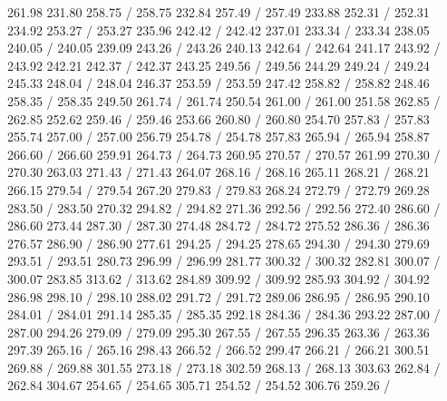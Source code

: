 { 261.98 231.80 258.75 /
 258.75 232.84 257.49 /
 257.49 233.88 252.31 /
 252.31 234.92 253.27 /
 253.27 235.96 242.42 /
 242.42 237.01 233.34 /
 233.34 238.05 240.05 /
 240.05 239.09 243.26 /
 243.26 240.13 242.64 /
 242.64 241.17 243.92 /
 243.92 242.21 242.37 /
 242.37 243.25 249.56 /
 249.56 244.29 249.24 /
 249.24 245.33 248.04 /
 248.04 246.37 253.59 /
 253.59 247.42 258.82 /
 258.82 248.46 258.35 /
 258.35 249.50 261.74 /
 261.74 250.54 261.00 /
 261.00 251.58 262.85 /
 262.85 252.62 259.46 /
 259.46 253.66 260.80 /
 260.80 254.70 257.83 /
 257.83 255.74 257.00 /
 257.00 256.79 254.78 /
 254.78 257.83 265.94 /
 265.94 258.87 266.60 /
 266.60 259.91 264.73 /
 264.73 260.95 270.57 /
 270.57 261.99 270.30 /
 270.30 263.03 271.43 /
 271.43 264.07 268.16 /
 268.16 265.11 268.21 /
 268.21 266.15 279.54 /
 279.54 267.20 279.83 /
 279.83 268.24 272.79 /
 272.79 269.28 283.50 /
 283.50 270.32 294.82 /
 294.82 271.36 292.56 /
 292.56 272.40 286.60 /
 286.60 273.44 287.30 /
 287.30 274.48 284.72 /
 284.72 275.52 286.36 /
 286.36 276.57 286.90 /
 286.90 277.61 294.25 /
 294.25 278.65 294.30 /
 294.30 279.69 293.51 /
 293.51 280.73 296.99 /
 296.99 281.77 300.32 /
 300.32 282.81 300.07 /
 300.07 283.85 313.62 /
 313.62 284.89 309.92 /
 309.92 285.93 304.92 /
 304.92 286.98 298.10 /
 298.10 288.02 291.72 /
 291.72 289.06 286.95 /
 286.95 290.10 284.01 /
 284.01 291.14 285.35 /
 285.35 292.18 284.36 /
 284.36 293.22 287.00 /
 287.00 294.26 279.09 /
 279.09 295.30 267.55 /
 267.55 296.35 263.36 /
 263.36 297.39 265.16 /
 265.16 298.43 266.52 /
 266.52 299.47 266.21 /
 266.21 300.51 269.88 /
 269.88 301.55 273.18 /
 273.18 302.59 268.13 /
 268.13 303.63 262.84 /
 262.84 304.67 254.65 /
 254.65 305.71 254.52 /
 254.52 306.76 259.26 /
}
